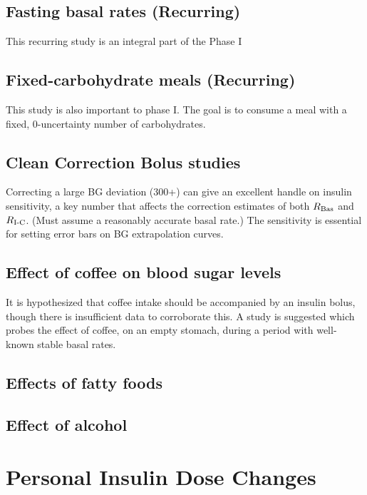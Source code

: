\subsection{Fasting basal rates (Recurring)}

This recurring study is an integral part of the Phase I 

\subsection{Fixed-carbohydrate meals (Recurring)}

This study is also important to phase I. The goal is to consume a meal with a fixed, 0-uncertainty number of carbohydrates.

\subsection{Clean Correction Bolus studies}

Correcting a large BG deviation (300+) can give an excellent handle on insulin sensitivity, a key number that affects the correction estimates of both $R_\text{Bas}$ and $R_\text{I-C}$. (Must assume a reasonably accurate basal rate.) The sensitivity is essential for setting error bars on BG extrapolation curves.

\subsection{Effect of coffee on blood sugar levels}

It is hypothesized that coffee intake should be accompanied by an insulin bolus, though there is insufficient data to corroborate this. A study is suggested which probes the effect of coffee, on an empty stomach, during a period with well-known stable basal rates.

\subsection{Effects of fatty foods}

\subsection{Effect of alcohol}

\section{Personal Insulin Dose Changes}

